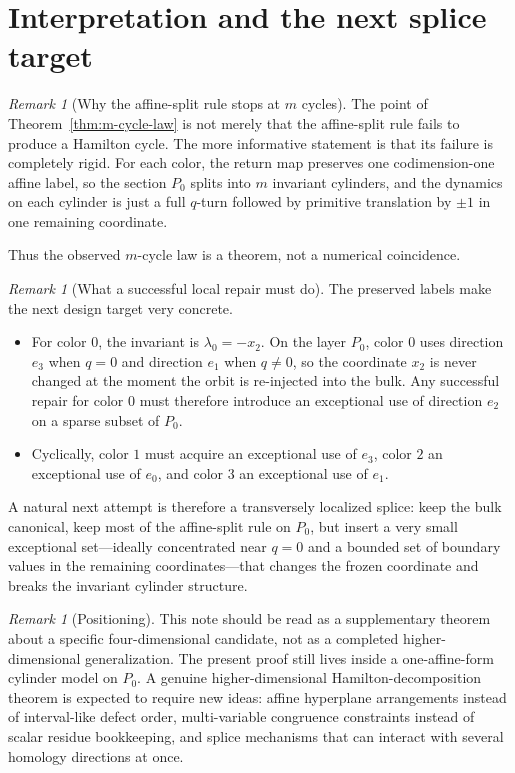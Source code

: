 \documentclass[11pt]{article}
\theoremstyle{definition}
\theoremstyle{remark}
\newtheorem{remark}[lemma]{Remark}
\begin{document}
\section{Interpretation and the next splice target}

\begin{remark}[Why the affine-split rule stops at $m$ cycles]
The point of Theorem~\ref{thm:m-cycle-law} is not merely that the affine-split rule fails to produce a Hamilton cycle. The more informative statement is that its failure is completely rigid. For each color, the return map preserves one codimension-one affine label, so the section $P_0$ splits into $m$ invariant cylinders, and the dynamics on each cylinder is just a full $q$-turn followed by primitive translation by $\pm 1$ in one remaining coordinate.

Thus the observed $m$-cycle law is a theorem, not a numerical coincidence.
\end{remark}

\begin{remark}[What a successful local repair must do]\label{rem:splice-target}
The preserved labels make the next design target very concrete.
\begin{itemize}
    \item For color $0$, the invariant is $\lambda_0=-x_2$. On the layer $P_0$, color $0$ uses direction $e_3$ when $q=0$ and direction $e_1$ when $q\neq 0$, so the coordinate $x_2$ is never changed at the moment the orbit is re-injected into the bulk. Any successful repair for color $0$ must therefore introduce an exceptional use of direction $e_2$ on a sparse subset of $P_0$.
    \item Cyclically, color $1$ must acquire an exceptional use of $e_3$, color $2$ an exceptional use of $e_0$, and color $3$ an exceptional use of $e_1$.
\end{itemize}
A natural next attempt is therefore a transversely localized splice: keep the bulk canonical, keep most of the affine-split rule on $P_0$, but insert a very small exceptional set---ideally concentrated near $q=0$ and a bounded set of boundary values in the remaining coordinates---that changes the frozen coordinate and breaks the invariant cylinder structure.
\end{remark}

\begin{remark}[Positioning]
This note should be read as a supplementary theorem about a specific four-dimensional candidate, not as a completed higher-dimensional generalization. The present proof still lives inside a one-affine-form cylinder model on $P_0$. A genuine higher-dimensional Hamilton-decomposition theorem is expected to require new ideas: affine hyperplane arrangements instead of interval-like defect order, multi-variable congruence constraints instead of scalar residue bookkeeping, and splice mechanisms that can interact with several homology directions at once.
\end{remark}
\end{document}
